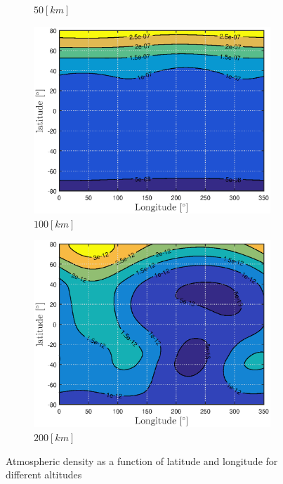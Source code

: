 \begin{figure}[h]
\begin{subfigure}{0.49\textwidth}
		\caption{$50 \left[km\right]$} 
		\label{fig:atmos_rho_50km}
	\end{subfigure}
	\begin{subfigure}{0.49\textwidth}
		\centering
		\includegraphics[width=0.98\textwidth]{Figure/Atmosphere/density_100km.eps}
		\caption{$100 \left[km\right]$} 
		\label{fig:atmos_rho_100km}
	\end{subfigure}
	\begin{subfigure}{0.49\textwidth}
		\centering
		\includegraphics[width=0.98\textwidth]{Figure/Atmosphere/density_200km.eps}
		\caption{$200 \left[km\right]$} 
		\label{fig:atmos_rho_200km}
	\end{subfigure}		
	\caption[Atmospheric density as a function of latitude and longitude]{Atmospheric density as a function of latitude and longitude for different altitudes}
	\label{fig:atmos_density_heights}
\end{figure}
